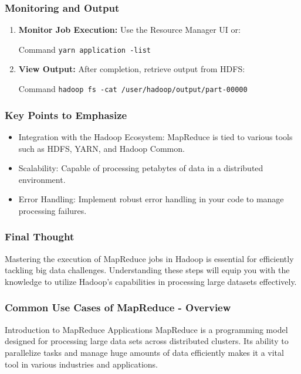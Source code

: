 \documentclass[aspectratio=169]{beamer}
\begin{document}
\begin{frame}[fragile]
    \frametitle{Monitoring and Output}
    \begin{enumerate}
        \item \textbf{Monitor Job Execution:}
            Use the Resource Manager UI or:
            \begin{block}{Command}
            \texttt{yarn application -list}
            \end{block}
        \item \textbf{View Output:}
            After completion, retrieve output from HDFS:
            \begin{block}{Command}
            \texttt{hadoop fs -cat /user/hadoop/output/part-00000}
            \end{block}
    \end{enumerate}
\end{frame}

\begin{frame}[fragile]
    \frametitle{Key Points to Emphasize}
    \begin{itemize}
        \item Integration with the Hadoop Ecosystem: 
            MapReduce is tied to various tools such as HDFS, YARN, and Hadoop Common.
        \item Scalability:
            Capable of processing petabytes of data in a distributed environment.
        \item Error Handling:
            Implement robust error handling in your code to manage processing failures.
    \end{itemize}
\end{frame}

\begin{frame}[fragile]
    \frametitle{Final Thought}
    Mastering the execution of MapReduce jobs in Hadoop is essential for efficiently tackling big data challenges. 
    Understanding these steps will equip you with the knowledge to utilize Hadoop's capabilities in processing large datasets effectively. 
\end{frame}

\begin{frame}[fragile]
    \frametitle{Common Use Cases of MapReduce - Overview}
    \begin{block}{Introduction to MapReduce Applications}
        MapReduce is a programming model designed for processing large data sets across distributed clusters. Its ability to parallelize tasks and manage huge amounts of data efficiently makes it a vital tool in various industries and applications.
    \end{block}
\end{frame}
\end{document}
